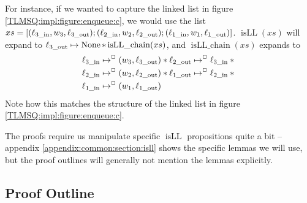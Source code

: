 \documentclass[a4paper, 10pt]{report}
\theoremstyle{definition}
\newcommand{\xsc}{xs}
\newcommand{\isLLchain}{\operatorname{isLL\_chain}}
\newcommand{\isLL}{\operatorname{isLL}}
\newcommand{\locinM}[1]{\loc_{#1\_\mathrm{in}}}
\newcommand{\locoutM}[1]{\loc_{#1\_\mathrm{out}}}
\newcommand{\nodeval}{\valB}
\newcommand{\nodevalM}[1]{\nodeval_{#1}}
\begin{document}
For instance, if we wanted to capture the linked list in figure \ref{TLMSQ:impl:figure:enqueue:c}, we would use the list $\xsc = [(\locinM{3}, \nodevalM{3}, \locoutM{3}); (\locinM{2}, \nodevalM{2}, \locoutM{2});  (\locinM{1}, \nodevalM{1}, \locoutM{1})]$. $\isLL(\xsc)$ will expand to $\locoutM{3} \mapsto \None \star{} \isLLchain(\xsc)$, and $\isLLchain(\xsc)$ expands to
\begin{align*}
  &\locinM{3} \mapsto^{\persistently} (\nodevalM{3}, \locoutM{3}) \star{} \locoutM{2}	\mapsto^{\persistently} \locinM{3}\star{}\\
  &\locinM{2} \mapsto^{\persistently} (\nodevalM{2}, \locoutM{2}) \star{} \locoutM{1}\mapsto^{\persistently} \locinM{2} \star{}\\
  &\locinM{1} \mapsto^{\persistently} (\nodevalM{1}, \locoutM{1})
\end{align*}
Note how this matches the structure of the linked list in figure \ref{TLMSQ:impl:figure:enqueue:c}.

The proofs require us manipulate specific $\isLL$ propositions quite a bit -- appendix \ref{appendix:common:section:isll} shows the specific lemmas we will use, but the proof outlines will generally not mention the lemmas explicitly.

\subsection{Proof Outline}
\label{TLMSQSEQ:sequential:sub:proof-outline}
\end{document}

